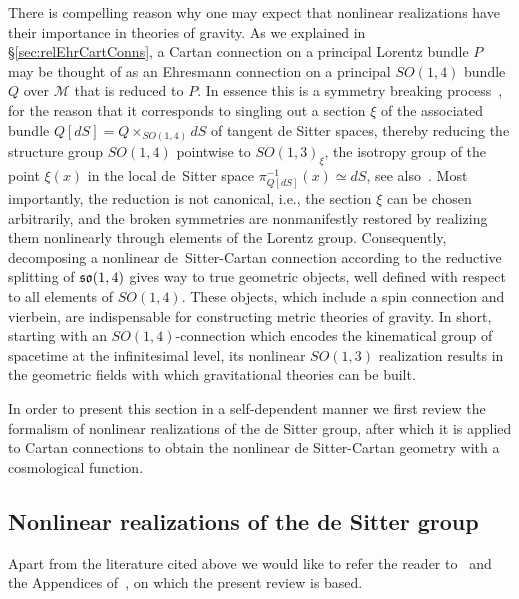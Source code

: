 \documentclass[
final,
11pt,
a4paper,
DIV=11,
headinclude=true,
footinclude=false,
bibliography=totoc,
twoside=true,  %
BCOR=5mm
]{scrbook}
\begin{document}
There is compelling reason why one may expect that nonlinear 
realizations have their importance in theories of gravity. As we 
explained in \S\ref{sec:relEhrCartConns}, a Cartan connection on 
a principal Lorentz bundle $P$ may be thought of as an Ehresmann 
connection on a principal $SO(1,4)$ bundle $Q$ over $\mathcal{M}$ 
that is reduced to $P$. In essence this is a symmetry breaking 
process~\cite{Wise:2011-sym.br}, for the reason that it 
corresponds to singling out a section $\xi$ of the associated 
bundle $Q[dS] = Q \times_{SO(1,4)} dS$ of tangent de Sitter 
spaces, thereby reducing the structure group $SO(1,4)$ pointwise 
to $SO(1,3)_\xi$, the isotropy group of the point $\xi(x)$ in the 
local de~Sitter space $\pi_{Q[dS]}^{-1}(x) \simeq dS$, see 
also~\cite{gibbons:2009b}.  Most importantly, the reduction is 
not canonical, i.e., the section $\xi$ can be chosen arbitrarily, 
and the broken symmetries are nonmanifestly restored by realizing 
them nonlinearly through elements of the Lorentz group.  
Consequently, decomposing a nonlinear de~Sitter-Cartan connection 
according to the reductive splitting of $\mathfrak{so}(1,4)$ gives way 
to true geometric objects, well defined with respect to all 
elements of $SO(1,4)$. These objects, which include a spin 
connection and vierbein, are indispensable for constructing 
metric theories of gravity. In short, starting with an 
$SO(1,4)$-connection which encodes the kinematical group of 
spacetime at the infinitesimal level, its nonlinear $SO(1,3)$ 
realization results in the geometric fields with which 
gravitational theories can be built.

In order to present this section in a self-dependent manner we 
first review the formalism of nonlinear realizations of the de 
Sitter group, after which it is applied to Cartan connections to 
obtain the nonlinear de Sitter-Cartan geometry with 
a cosmological function.


\subsection{Nonlinear realizations of the de Sitter group}
\label{ssec:nonlin_real_SO14}

Apart from the literature cited above we would like to refer the 
reader to~\cite{Zumino:1977nl} and the Appendices 
of~\cite{wess:1992ss}, on which the present review is based.
\end{document}
